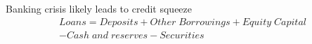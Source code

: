 \documentclass{beamer}
\begin{document}
\begin{frame}
\begin{table}[!h] \centering
\caption{Stylised bank balance sheet}
\end{table}
\end{frame}

\begin{frame}  
Banking crisis likely leads to credit squeeze
\begin{align*}
  Loans= Deposits + Other\;Borrowings + Equity\;Capital\\
  - Cash\;and\;reserves -   Securities
\end{align*}
\end{frame}
\end{document}
